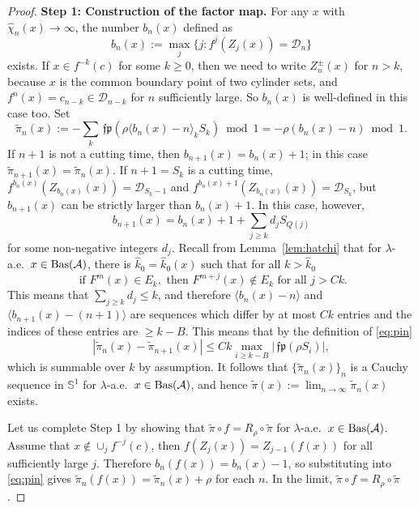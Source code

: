 \documentclass[12pt, psamsfonts, reqno]{amsart}
\begin{document}
\begin{proof} {\bf Step 1: Construction of the factor map.}
For any $x$ with $\hat \chi_n(x) \to \infty$, the number $b_n(x)$
defined as
$$ \label{eq:bn}
b_n(x) := \max_j \{ j : f^j(Z_j(x)) = {{\mathcal D}}_n \}
$$
exists. If $x \in f^{-k}(c)$ for some $k \geq 0$, then we need to write
$Z^\pm_n(x)$ for $n > k$, because $x$ is the common boundary point of two
cylinder sets, and $f^n(x) = c_{n-k} \in {{\mathcal D}}_{n-k}$ for $n$ sufficiently large.
So $b_n(x)$ is well-defined in this case too.
Set
\begin{equation} \label{eq:pin}
\tilde \pi_n(x) := -\sum_k {\,\mathfrak{fp}}( \rho \langle b_n(x)-n \rangle_k S_k )
\bmod 1 = -\rho(b_n(x)-n) \bmod 1.
\end{equation}
If $n+1$ is not a cutting time, then $b_{n+1}(x) = b_n(x) + 1$; in
this case $\tilde \pi_{n+1}(x) = \tilde \pi_n(x)$. If $n+1 = S_k$ is a cutting
time, $f^{b_n(x)}(Z_{b_n(x)}(x)) = {{\mathcal D}}_{S_k-1}$ and
$f^{b_n(x)+1}(Z_{b_n(x)}(x)) = {{\mathcal D}}_{S_k}$, but $b_{n+1}(x)$ can be
strictly larger than $b_{n}(x)+1$. In this case, however,
\[
b_{n+1}(x) = b_{n}(x)+1 + \sum_{j \geq k}  d_j S_{Q(j)}
\]
for some non-negative integers $d_j$.
Recall from Lemma~\ref{lem:hatchi} that for
$\lambda$-a.e.\ $x \in {\mathop{\rm Bas}\nolimits}({{\mathcal A}})$, there is $\hat k_0 = \hat k_0(x)$ such that
for all $k > \hat k_0$
\begin{equation}\label{eq:driftCBbis}
\text{ if } F^m(x) \in E_k, \text{ then } F^{m+j}(x) \notin E_k
\text{ for all } j > Ck.
\end{equation}
This means that $\sum_{j \geq k} d_j \leq k$, and therefore
$\langle b_n(x)-n \rangle$ and $\langle b_{n+1}(x)- (n+1) \rangle$
are sequences
which differ by at most $C k$ entries and the indices of these
entries are $\geq k-B$. This means that by the definition of
\eqref{eq:pin}
\begin{equation}\label{eq:Ckmax}
|\tilde \pi_n(x) - \tilde \pi_{n+1}(x)| \leq C k
\max_{i \geq k-B}| {\,\mathfrak{fp}}( \rho S_i ) |,
\end{equation}
which is summable over $k$ by assumption.
It follows that $\{ \tilde \pi_n(x)\}_n$ is a Cauchy sequence in
${{\mathbb S}}^1$ for $\lambda$-a.e.\ $x
\in {\mathop{\rm Bas}\nolimits}({{\mathcal A}})$, and hence $\tilde \pi(x) := \lim_{n \to \infty} \tilde \pi_n(x)$
exists.

Let us complete Step 1 by showing that $\tilde \pi \circ f = R_\rho \circ \tilde \pi$ for $\lambda$-a.e.\ $x \in {\mathop{\rm Bas}\nolimits}({{\mathcal A}})$.
Assume that $x \notin \cup_j f^{-j}(c)$, then $f(Z_j(x)) = Z_{j-1}(f(x))$
for all sufficiently large $j$.
Therefore $b_n(f(x)) = b_n(x) - 1$, so substituting
into \eqref{eq:pin} gives $\tilde \pi_n(f(x)) = \tilde \pi_n(x) + \rho$ for each
$n$. In the limit, $\tilde \pi \circ f = R_\rho \circ \tilde \pi$.


\end{proof}
\end{document}
